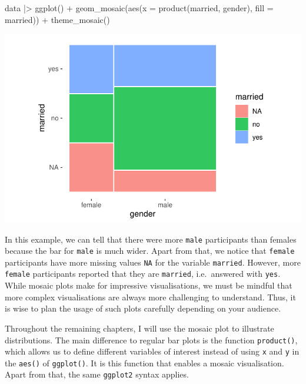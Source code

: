 \documentclass[
  letterpaper,
]{krantz}
\makeatletter
\newenvironment{Shaded}{\begin{snugshade}}{\end{snugshade}}
\newcommand{\AttributeTok}[1]{\textcolor[rgb]{0.40,0.45,0.13}{#1}}
\newcommand{\FunctionTok}[1]{\textcolor[rgb]{0.28,0.35,0.67}{#1}}
\newcommand{\NormalTok}[1]{\textcolor[rgb]{0.00,0.23,0.31}{#1}}
\newcommand{\SpecialCharTok}[1]{\textcolor[rgb]{0.37,0.37,0.37}{#1}}
\newenvironment{kframe}{%
\medskip{}
\setlength{\fboxsep}{.8em}
 \def\at@end@of@kframe{}%
 \ifinner\ifhmode%
  \def\at@end@of@kframe{\end{minipage}}%
  \begin{minipage}{\columnwidth}%
 \fi\fi%
 \def\FrameCommand##1{\hskip\@totalleftmargin \hskip-\fboxsep
 \colorbox{shadecolor}{##1}\hskip-\fboxsep
     \hskip-\linewidth \hskip-\@totalleftmargin \hskip\columnwidth}%
 \MakeFramed {\advance\hsize-\width
   \@totalleftmargin\z@ \linewidth\hsize
   \@setminipage}}%
 {\par\unskip\endMakeFramed%
 \at@end@of@kframe}
\renewenvironment{Shaded}{\begin{kframe}}{\end{kframe}}
\makeatother
\begin{document}
\begin{Shaded}
\begin{Highlighting}[]
\NormalTok{data }\SpecialCharTok{|\textgreater{}}
  \FunctionTok{ggplot}\NormalTok{() }\SpecialCharTok{+}
  \FunctionTok{geom\_mosaic}\NormalTok{(}\FunctionTok{aes}\NormalTok{(}\AttributeTok{x =} \FunctionTok{product}\NormalTok{(married, gender),}
                  \AttributeTok{fill =}\NormalTok{ married)) }\SpecialCharTok{+}
  \FunctionTok{theme\_mosaic}\NormalTok{()}
\end{Highlighting}
\end{Shaded}

\includegraphics{11_group_comparison_files/figure-pdf/mosaic-plot-gender-married-plot-1.pdf}

In this example, we can tell that there were more \texttt{male}
participants than females because the bar for \texttt{male} is much
wider. Apart from that, we notice that \texttt{female} participants have
more missing values \texttt{NA} for the variable \texttt{married}.
However, more \texttt{female} participants reported that they are
\texttt{married}, i.e.~answered with \texttt{yes}. While mosaic plots
make for impressive visualisations, we must be mindful that more complex
visualisations are always more challenging to understand. Thus, it is
wise to plan the usage of such plots carefully depending on your
audience.

Throughout the remaining chapters, I will use the mosaic plot to
illustrate distributions. The main difference to regular bar plots is
the function \texttt{product()}, which allows us to define different
variables of interest instead of using \texttt{x} and \texttt{y} in the
\texttt{aes()} of \texttt{ggplot()}. It is this function that enables a
mosaic visualisation. Apart from that, the same \texttt{ggplot2} syntax
applies.
\end{document}
